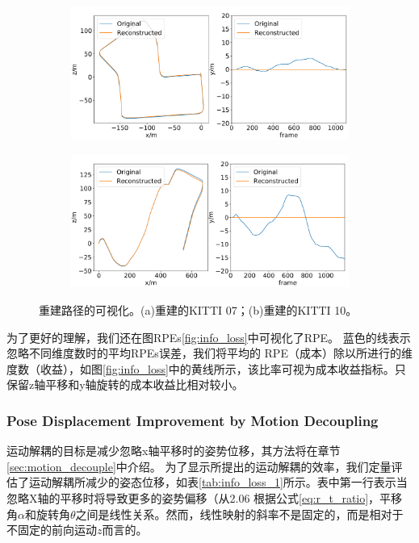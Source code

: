 \begin{figure}[ht]
    \centering
    \begin{subfigure}[b]{0.7\textwidth}
        \includegraphics[width=\textwidth]{datavo/path_recon_07.pdf}
        \caption{}
        \label{fig:recon_07}
        \vspace{4pt}
    \end{subfigure}
    \begin{subfigure}[b]{0.7\textwidth}
        \includegraphics[width=\textwidth]{datavo/path_recon_10.pdf}
        \caption{}
        \label{fig:recon_10}
    \end{subfigure}
  \caption{重建路径的可视化。(a)重建的KITTI 07；(b)重建的KITTI 10。}     
  \label{fig:path_recon}
\end{figure}
为了更好的理解，我们还在图{RPEs}\ref{fig:info_loss}中可视化了RPE。 蓝色的线表示忽略不同维度数时的平均{RPEs}误差，我们将平均的
RPE（成本）除以所进行的维度数（收益），如图\ref{fig:info_loss}中的黄线所示，该比率可视为成本收益指标。只保留z轴平移和y轴旋转的成本收益比相对较小。
\subsubsection{Pose Displacement Improvement by Motion Decoupling}
\label{sec:info_decouple}
运动解耦的目标是减少忽略x轴平移时的姿势位移，其方法将在章节\ref{sec:motion_decouple}中介绍。
为了显示所提出的运动解耦的效率，我们定量评估了运动解耦所减少的姿态位移，如表\ref{tab:info_loss_1}所示。表中第一行表示当忽略X轴的平移时将导致更多的姿势偏移（从2.06%
根据公式\eqref{eq:r_t_ratio}，平移角$\alpha$和旋转角$\theta$之间是线性关系。然而，线性映射的斜率不是固定的，而是相对于不固定的前向运动$z$而言的。

